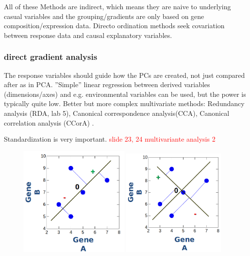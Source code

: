 \documentclass{article}
\begin{document}
All of these Methods are indirect, which means they are naive to underlying casual variables and the grouping/gradients are only based on gene composition/expression data. Directo ordination methods seek covariation between response data and causal explanatory variables.

\subsubsection{direct gradient analysis}
The response variables should guide how the PCs are created, not just compared after as in PCA. ”Simple” linear regression between derived variables (dimensions/axes) and e.g. environmental variables can be used, but the power is typically quite low. Better but more complex multivariate methods: Redundancy analysis (RDA, lab 5), Canonical correspondence analysis(CCA), Canonical correlation analysis (CCorA) .\par
Standardization is very important.
\textcolor{red}{slide 23, 24 multivariante analysis 2}\par 

\begin{figure}[h]
    \centering
    \includegraphics[width = 0.49\textwidth]{PCA/1PC.png}
    \includegraphics[width = 0.46\textwidth]{PCA/2PC.png}
\end{figure}
\end{document}
